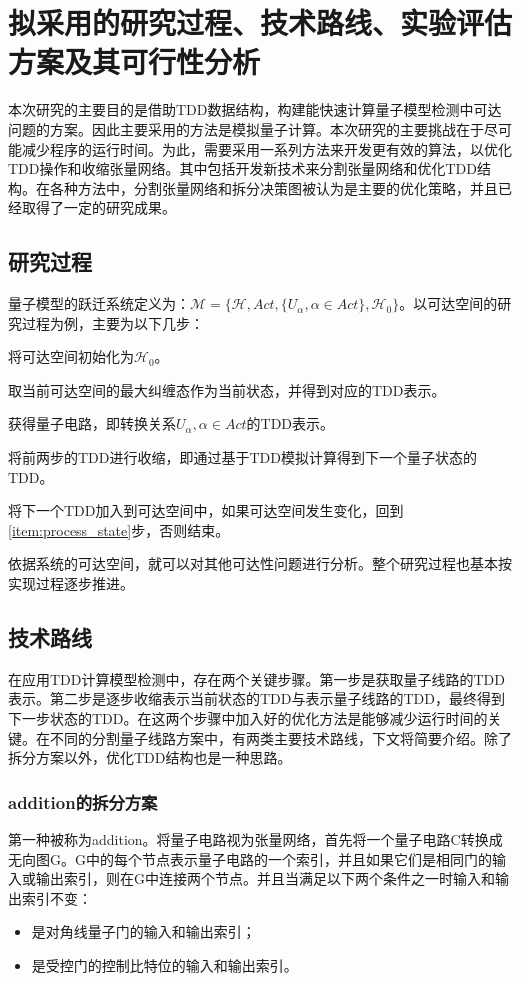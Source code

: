\section{拟采用的研究过程、技术路线、实验评估方案及其可行性分析}
本次研究的主要目的是借助TDD数据结构，构建能快速计算量子模型检测中可达问题的方案。因此主要采用的方法是模拟量子计算。本次研究的主要挑战在于尽可能减少程序的运行时间。为此，需要采用一系列方法来开发更有效的算法，以优化TDD操作和收缩张量网络。其中包括开发新技术来分割张量网络和优化TDD结构。在各种方法中，分割张量网络和拆分决策图被认为是主要的优化策略，并且已经取得了一定的研究成果。
\subsection{研究过程}
量子模型的跃迁系统定义为：$\mathcal{M}=\{\mathcal{H},Act,\{U_\alpha,\alpha\in Act\},\mathcal{H}_0\}$。以可达空间的研究过程为例，主要为以下几步：
\begin{myen}
	\item \label{item:process_inital}将可达空间初始化为$\mathcal{H}_0$。
	\item \label{item:process_state}取当前可达空间的最大纠缠态作为当前状态，并得到对应的TDD表示。
	\item \label{item:process_cir}获得量子电路，即转换关系$U_\alpha,\alpha\in Act$的TDD表示。
	\item \label{item:process_cont} 将前两步的TDD进行收缩，即通过基于TDD模拟计算得到下一个量子状态的TDD。
	\item \label{item:process_end}将下一个TDD加入到可达空间中，如果可达空间发生变化，回到\ref{item:process_state}步，否则结束。
\end{myen}
	
依据系统的可达空间，就可以对其他可达性问题进行分析。整个研究过程也基本按实现过程逐步推进。
\subsection{技术路线}
在应用TDD计算模型检测中，存在两个关键步骤。第一步是获取量子线路的TDD表示。第二步是逐步收缩表示当前状态的TDD与表示量子线路的TDD，最终得到下一步状态的TDD。在这两个步骤中加入好的优化方法是能够减少运行时间的关键。在不同的分割量子线路方案中，有两类主要技术路线，下文将简要介绍。除了拆分方案以外，优化TDD结构也是一种思路。
\subsubsection{addition的拆分方案}
\label{addition}
第一种被称为addition\citep{chen2018classical}。将量子电路视为张量网络，首先将一个量子电路C转换成无向图G。G中的每个节点表示量子电路的一个索引，并且如果它们是相同门的输入或输出索引，则在G中连接两个节点。并且当满足以下两个条件之一时输入和输出索引不变：
\begin{itemize}
	\item 是对角线量子门的输入和输出索引；
	\item 是受控门的控制比特位的输入和输出索引。
\end{itemize}
	
